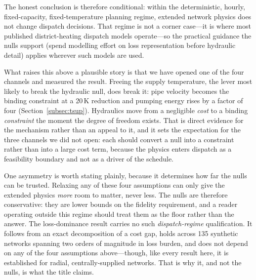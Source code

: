 The honest conclusion is therefore conditional: within the deterministic, hourly,
fixed-capacity, fixed-temperature planning regime, extended network physics does not change
dispatch decisions. That regime is not a corner case---it is where most published
district-heating dispatch models operate---so the practical guidance the nulls support (spend
modelling effort on loss representation before hydraulic detail) applies wherever such models
are used.

What raises this above a plausible story is that we have opened one of the four channels
and measured the result. Freeing the supply temperature, the lever most likely to break the
hydraulic null, does break it: pipe velocity becomes the binding constraint at a 20\,K
reduction and pumping energy rises by a factor of four
(Section~\ref{subsec:tsup}). Hydraulics move from a negligible \emph{cost} to a binding
\emph{constraint} the moment the degree of freedom exists. That is direct evidence for the
mechanism rather than an appeal to it, and it sets the expectation for the three channels
we did not open: each should convert a null into a constraint rather than into a large cost
term, because the physics enters dispatch as a feasibility boundary and not as a driver of
the schedule.

One asymmetry is worth stating plainly, because it determines how far the nulls can be
trusted. Relaxing any of these four assumptions can only give the extended physics
\emph{more} room to matter, never less. The nulls are therefore conservative: they are
lower bounds on the fidelity requirement, and a reader operating outside this regime should
treat them as the floor rather than the answer. The loss-dominance result carries no such
\emph{dispatch-regime} qualification. It follows from an exact decomposition of a cost gap,
holds across 135 synthetic networks spanning two orders of magnitude in loss burden, and
does not depend on any of the four assumptions above---though, like every result here, it is
established for radial, centrally-supplied networks. That is why it, and not the nulls, is
what the title claims.
